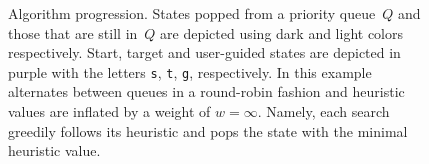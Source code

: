 \documentclass{article}
\begin{document}
\begin{figure}[t]%
  \centering%
  \caption{%
    Algorithm progression.
    States popped from a priority queue~$Q$ and those that are still in~$Q$ are depicted using dark and light colors respectively.
    Start, target and user-guided states are depicted in purple with the letters \texttt{s}, \texttt{t}, \texttt{g}, respectively. 
    In this example \mhastar alternates between queues in a round-robin fashion and heuristic values are inflated by a weight of $w=\infty$.
    Namely, each search greedily follows its heuristic and pops the state with the minimal heuristic value.
}
\end{figure}
\end{document}
